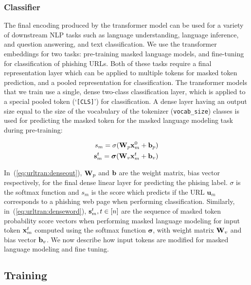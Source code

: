 \subsubsection{Classifier}
%
The final encoding produced by the transformer model can be used for a variety of downstream NLP tasks such
as language understanding, language inference, and question answering, and text classification.
We use the transformer embeddings for two tasks: pre-training masked language models, and fine-tuning for classification of phishing URLs.
Both of these tasks require a final representation layer which can be applied to multiple tokens for masked token prediction, and a pooled representation for classification.
The transformer models that we train use a single, dense two-class classification layer, which is applied to a special pooled token (`\texttt{[CLS]}') for classification. A dense layer having an output size equal to the size of the vocabulary of the tokenizer (\texttt{vocab\_size}) classes is used for predicting the masked token for the masked language modeling task during pre-training:

\begin{align}
	s_m = \sigma({\mathbf{W}}_{p} {\mathbf{x}}_m^0 + {\mathbf{b}}_p) \label{eq:urltran:denseout}\\
	{\mathbf{s}}_m^t = \bm{\sigma} ({\mathbf{W}}_{v} {\mathbf{x}}_m^t + {\mathbf{b}}_v) \label{eq:urltran:denseword}
\end{align}

\noindent  In~(\ref{eq:urltran:denseout}), ${\mathbf{W}}_{p}$ and ${\mathbf{b}}$ are the weight matrix, bias vector respectively, for the final
dense linear layer for predicting the phising label.
$\sigma$ is the softmax function and 
 $s_m$ is the
score which predicts if the URL $\mathbf{u}_m$ corresponds to a phishing web page when performing classification.
Similarly, in~(\ref{eq:urltran:denseword}),
${\mathbf{s}}_m^t, t \in [n]$ are 
 the sequence of masked token probability score vectors when performing masked language modeling for input token ${\mathbf{x}}_m^t$ computed using the softmax function $\bm{\sigma}$, with weight matrix ${\mathbf{W}}_{v}$ and bias vector ${\mathbf{b}}_v$.
 We now describe how input tokens are modified for masked language modeling and fine tuning.

\subsection{Training}
%
